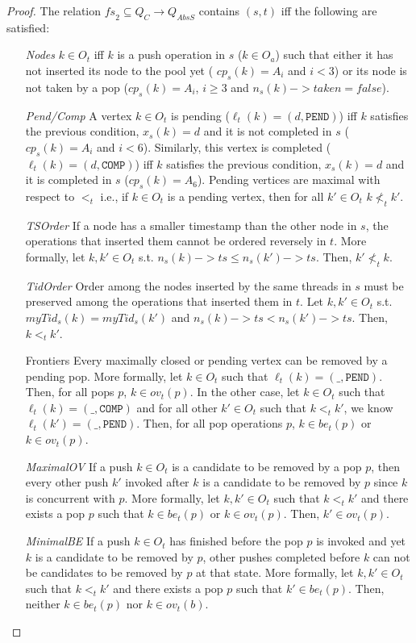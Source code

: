 \begin{proof}
The relation $\mathit{fs}_2 \subseteq Q_C \rightarrow Q_{AbsS}$ contains $(s,t)$ iff the following are satisfied:
\begin{itemize}
\item[\emph{Nodes}] $k \in O_t$ iff $k$ is a push operation in $s$ ($k \in O_a$) such that either it has not inserted its node to the pool yet ( $cp_s(k) = A_i$ and $i<3$) or its node is not taken by a pop ($cp_s(k) = A_i$, $i\geq 3$ and $n_s(k)->taken = false$). 
\item[\emph{Pend/Comp}] A vertex $k \in O_t$ is pending ($\ell_t(k) = (d, \texttt{PEND})$) iff $k$ satisfies the previous condition, $x_s(k) = d$ and it is not completed in $s$ ($cp_s(k) = A_i$ and $i<6$). Similarly, this vertex is completed ($\ell_t(k) = (d, \texttt{COMP})$) iff $k$ satisfies the previous condition, $x_s(k) = d$ and it is completed in $s$ ($cp_s(k) = A_6$). Pending vertices are maximal with respect to $<_t$ i.e., if $k \in O_t$ is a pending vertex, then for all $k' \in O_t$ $k \nless_t k'$.
\item[\emph{TSOrder}] If a node has a smaller timestamp than the other node in $s$, the operations that inserted them cannot be ordered reversely in $t$. More formally, let $k, k' \in O_t$ s.t. $n_s(k)-> ts \leq n_s(k')->ts$. Then, $k' \nless_t k$.
\item[\emph{TidOrder}] Order among the nodes inserted by the same threads in $s$ must be preserved among the operations that inserted them in $t$. Let $k, k' \in O_t$ s.t. $myTid_s(k) = myTid_s(k')$ and $n_s(k)->ts < n_s(k')->ts$. Then, $k <_t k'$.
\item[Frontiers] Every maximally closed or pending vertex can be removed by a pending pop. More formally, let $k \in O_t$ such that $\ell_t(k) = (\_,\texttt{PEND})$. Then, for all pops $p$, $k \in ov_t(p)$. In the other case, let $k \in O_t$ such that $\ell_t(k) = (\_,\texttt{COMP})$ and for all other $k' \in O_t$ such that $k<_t k'$, we know $\ell_t(k') = (\_,\texttt{PEND})$. Then, for all pop operations $p$, $k \in be_t(p)$ or $k \in ov_t(p)$. 
\item[\emph{MaximalOV}] If a push $k \in O_t$ is a candidate to be removed by a pop $p$, then every other push $k'$ invoked after $k$ is a candidate to be removed by $p$ since $k$ is concurrent with $p$. More formally, let $k, k' \in O_t$ such that $k <_t k'$ and there exists a pop $p$ such that $k \in be_t(p)$ or $k \in ov_t(p)$. Then, $k' \in ov_t(p)$.
\item[\emph{MinimalBE}] If a push $k \in O_t$ has finished before the pop $p$ is invoked and yet $k$ is a candidate to be removed by $p$, other pushes completed before $k$ can not be candidates to be removed by $p$ at that state. More formally, let $k, k' \in O_t$ such that $k <_t k'$ and there exists a pop $p$ such that $k' \in be_t(p)$. Then, neither $k \in be_t(p)$ nor $k \in ov_t(b)$.

\end{itemize}
\end{proof}
